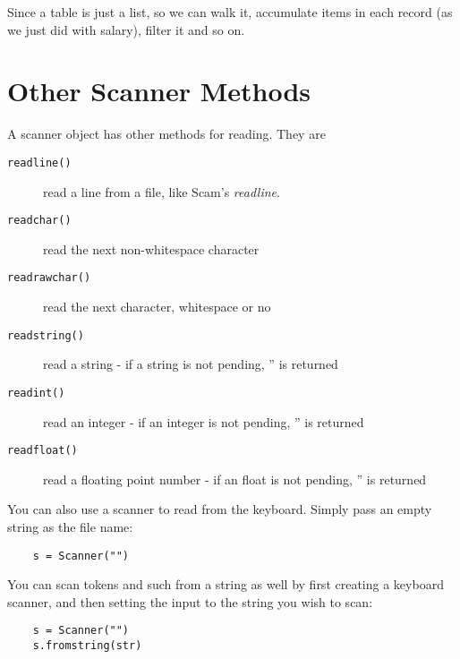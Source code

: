 Since a table is just a list, so we can walk it, accumulate
items in each record (as we just did with salary), filter it and so on.

\section{Other Scanner Methods}

A scanner object has other methods for reading. They are

\begin{description}
\item[{\tt readline()}]
    read a line from a file, like Scam's {\it readline}.
\item[{\tt readchar()}]
    read the next non-whitespace character
\item[{\tt readrawchar()}]
    read the next character, whitespace or no
\item[{\tt readstring()}]
    read a string - if a string is not pending, '' is returned
\item[{\tt readint()}]
    read an integer - if an integer is not pending, '' is returned
\item[{\tt readfloat()}]
    read a floating point number - if an float is not pending, '' is returned
\end{description}

You can also use a scanner to read from the keyboard. Simply
pass an empty string as the file name:

\begin{verbatim}
    s = Scanner("")
\end{verbatim}

You can scan tokens and such from a string as well by first
creating a keyboard scanner, and then setting the input
to the string you wish to scan:

\begin{verbatim}
    s = Scanner("")
    s.fromstring(str)
\end{verbatim}
